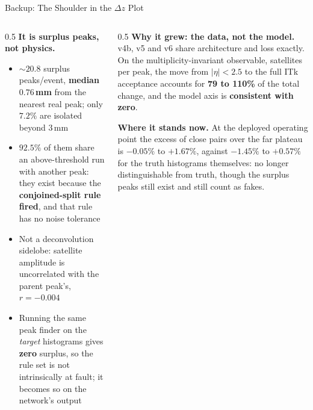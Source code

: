 \documentclass[xcolor=table,aspectratio=169]{beamer}
\begin{document}
\begin{frame}{Backup: The Shoulder in the $\Delta z$ Plot}
    \begin{columns}[t]
        \begin{column}{0.5\linewidth}
            \small
            \textbf{It is surplus peaks, not physics.}
            \begin{itemize}\setlength\itemsep{0.25em}
                \item ${\sim}20.8$ surplus peaks/event, \textbf{median $0.76$\,mm} from
                    the nearest real peak; only $7.2\%$ are isolated beyond $3$\,mm
                \item \textbf{$92.5\%$} of them share an above-threshold run with
                    another peak: they exist because the \textbf{conjoined-split rule
                    fired}, and that rule has no noise tolerance
                \item Not a deconvolution sidelobe: satellite amplitude is uncorrelated
                    with the parent peak's, $r = -0.004$
                \item Running the same peak finder on the \emph{target} histograms gives
                    \textbf{zero} surplus, so the rule set is not intrinsically at
                    fault; it becomes so on the network's output
            \end{itemize}
        \end{column}
        \begin{column}{0.5\linewidth}
            \small
            \textbf{Why it grew: the data, not the model.} v4b, v5 and v6 share
            architecture and loss exactly. On the multiplicity-invariant observable,
            satellites per peak, the move from $|\eta|<2.5$ to the full ITk acceptance
            accounts for \textbf{79 to 110\%} of the total change, and the model axis is
            \textbf{consistent with zero}.
            \vspace{0.7em}

            \textbf{Where it stands now.} At the deployed operating point the excess of
            close pairs over the far plateau is $-0.05\%$ to $+1.67\%$, against
            $-1.45\%$ to $+0.57\%$ for the truth histograms themselves: no longer
            distinguishable from truth, though the surplus peaks still exist and still
            count as fakes.
        \end{column}
    \end{columns}
\end{frame}
\end{document}
